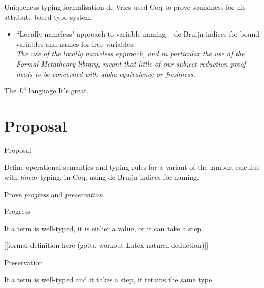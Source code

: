 \documentclass[10pt]{beamer}
\begin{document}
\begin{frame}{Uniqueness typing formalisation}
de Vries used Coq to prove soundness for his attribute-based type system.

\begin{itemize}
\item ``Locally nameless" approach to variable naming -- de Bruijn indices for bound variables and names for free variables.\\

\textit{The use of the locally nameless approach, and in particular the use of the Formal Metatheory library, meant that little of our subject reduction
proof needs to be concerned with alpha-equivalence or freshness.}

\end{itemize}
\end{frame}

\begin{frame}{The \textbf{$L^3$} language}
It's great.
\end{frame}

\section{Proposal}

\begin{frame}{Proposal}

Define operational semantics and typing rules for a variant of the lambda calculus with \textit{linear} typing, in Coq, using de Bruijn indices for naming.

Prove \textit{progress} and \textit{preservation}.
\end{frame}

\begin{frame}{Progress}

If a term is well-typed, it is either a value, or it can take a step.

[[formal definition here (gotta workout Latex natural deduction)]]
\end{frame}

\begin{frame}{Preservation}

If a term is well-typed and it takes a step, it retains the same type.

\end{frame}
\end{document}
